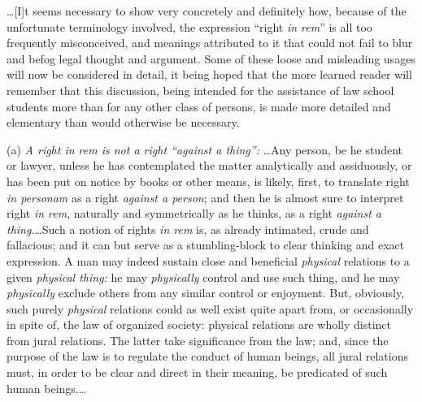 \ldots[I]t seems necessary to show very concretely and definitely how, because
of the unfortunate terminology involved, the expression ``right \textit{in
rem}'' is all too frequently misconceived, and meanings attributed to it that
could not fail to blur and befog legal thought and argument. Some of these
loose and misleading usages will now be considered in detail, it being hoped
that the more learned reader will remember that this discussion, being intended
for the assistance of law school students more than for any other class of
persons, is made more detailed and elementary than would otherwise be
necessary.

(a) \textit{A right in rem is not a right ``against a thing'':} \ldots Any
person, be he student or lawyer, unless he has contemplated the matter
analytically and assiduously, or has been put on notice by books or other
means, is likely, first, to translate right \textit{in personam} as a right
\textit{against a person}; and then he is almost sure to interpret right
\textit{in rem}, naturally and symmetrically as he thinks, as a right
\textit{against a thing}.\ldots Such a notion of rights \textit{in rem} is,
as already intimated, crude and fallacious; and it can but serve as a
stumbling-block to clear thinking and exact expression. A man may indeed
sustain close and beneficial \textit{physical} relations to a given
\textit{physical thing:} he may \textit{physically} control and use such thing,
and he may \textit{physically} exclude others from any similar control or
enjoyment. But, obviously, such purely \textit{physical} relations could as
well exist quite apart from, or occasionally in spite of, the law of organized
society: physical relations are wholly distinct from jural relations. The
latter take significance from the law; and, since the purpose of the law is to
regulate the conduct of human beings, all jural relations must, in order to be
clear and direct in their meaning, be predicated of such human beings.\ldots

